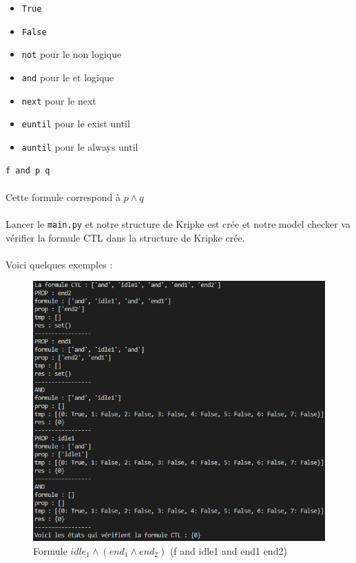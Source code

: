 \documentclass[12pt,a4paper]{report}
\begin{document}
\begin{itemize}
    \item \verb+True+
    \item \verb+False+
    \item \verb+not+ pour le non logique
    \item \verb+and+ pour le et logique
    \item \verb+next+ pour le next
    \item \verb+euntil+ pour le exist until
    \item \verb+auntil+ pour le always until
\end{itemize}

\begin{verbatim}
f and p q
\end{verbatim}

\paragraph{}Cette formule correspond à $p \land q$

\paragraph{}Lancer le \verb+main.py+ et notre structure de Kripke est crée et notre model checker va vérifier la formule CTL dans la structure de Kripke crée.

\paragraph{}Voici quelques exemples :

\begin{figure}[H]
  \centering
      \includegraphics[scale=0.75]{Images/resultat_main_1.PNG}
  \caption{Formule $idle_{1}\land (end_{1} \land end_{2})$ (f and idle1 and end1 end2)}
\end{figure}
\end{document}
